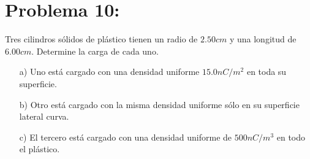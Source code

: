 \documentclass[12pt]{article}
\begin{document}
		\section{Problema 10:}\label{sec:Problema10}
			Tres cilindros sólidos de plástico tienen un radio de $ 2.50cm $ y una longitud de
			$ 6.00cm $.  Determine la carga de cada uno.
				\begin{enumerate}
					\item[a)]	Uno está cargado con una densidad uniforme $ 15.0 nC/m^2 $ en toda su
					superficie.
					\item[b)]	Otro está cargado con la misma densidad uniforme sólo en su superficie
					lateral curva.
					\item[c)] El tercero está cargado con una densidad uniforme de $ 500 nC/m^3 $
					en todo el plástico.
				\end{enumerate}
     
	
\end{document}
